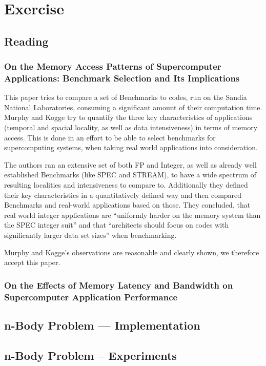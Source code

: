 \documentclass[]{scrartcl}
\newcommand{\exercise}{Exercise \thesection}
\begin{document}
\section*{\exercise}

\subsection{Reading}
\subsubsection{On the Memory Access Patterns of Supercomputer Applications: Benchmark Selection and Its Implications}
This paper tries to compare a set of Benchmarks to codes, run on the Sandia National Laboratories, consuming a significant amount of their computation time.
Murphy and Kogge try to quantify the three key characteristics of applications (temporal and spacial locality, as well as data intensiveness) in terms of memory access.
This is done in an effort to be able to select benchmarks for supercomputing systems, when taking real world applications into consideration.

The authors ran an extensive set of both FP and Integer, as well as already well established Benchmarks (like SPEC and STREAM), to have a wide spectrum of resulting localities and intensiveness to compare to.
Additionally they defined their key characteristics in a quantitatively defined way and then compared Benchmarks and real-world applications based on those.
They concluded, that real world integer applications are ``uniformly harder on the memory system than the SPEC integer suit'' and that ``architects should focus on codes with significantly larger data set sizes'' when benchmarking.

Murphy and Kogge's observations are reasonable and clearly shown, we therefore accept this paper.


\subsubsection{On the Effects of Memory Latency and Bandwidth on Supercomputer Application Performance}

\subsection{n-Body Problem --- Implementation}
\subsection{n-Body Problem – Experiments}
\end{document}
